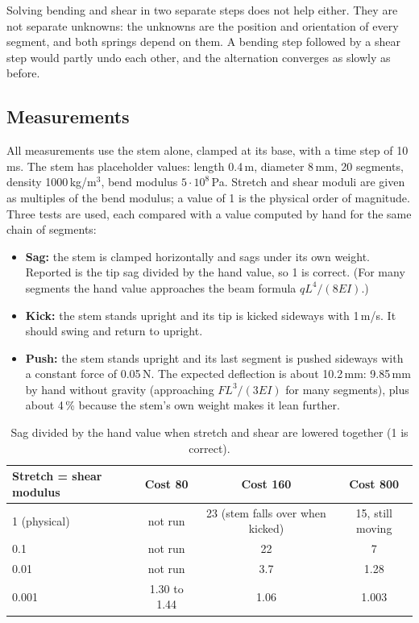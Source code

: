 \documentclass[11pt,a4paper]{article}
\begin{document}
Solving bending and shear in two separate steps does not help either. They are not separate unknowns: the
unknowns are the position and orientation of every segment, and both springs depend on them. A bending
step followed by a shear step would partly undo each other, and the alternation converges as slowly as
before.

\subsection{Measurements}

All measurements use the stem alone, clamped at its base, with a time step of 10\,ms. The stem has
placeholder values: length 0.4\,m, diameter 8\,mm, 20 segments, density 1000\,kg/m$^3$, bend modulus
$5\cdot10^{8}$\,Pa. Stretch and shear moduli are given as multiples of the bend modulus; a value of 1 is
the physical order of magnitude. Three tests are used, each compared with a value computed by hand for the
same chain of segments:
\begin{itemize}
  \item \textbf{Sag:} the stem is clamped horizontally and sags under its own weight. Reported is the tip
        sag divided by the hand value, so 1 is correct. (For many segments the hand value approaches the
        beam formula $qL^{4}/(8EI)$.)
  \item \textbf{Kick:} the stem stands upright and its tip is kicked sideways with 1\,m/s. It should swing
        and return to upright.
  \item \textbf{Push:} the stem stands upright and its last segment is pushed sideways with a constant
        force of 0.05\,N. The expected deflection is about 10.2\,mm: 9.85\,mm by hand without gravity
        (approaching $FL^{3}/(3EI)$ for many segments), plus about 4\,\% because the stem's own weight
        makes it lean further.
\end{itemize}

\begin{table}[h]
  \centering
  \caption{Sag divided by the hand value when stretch and shear are lowered together (1 is correct).}
  \label{tab:stem-together}
  \begin{tabular}{lccc}
    \toprule
    Stretch = shear modulus & Cost 80 & Cost 160 & Cost 800 \\
    \midrule
    1 (physical)  & not run      & 23 (stem falls over when kicked) & 15, still moving \\
    0.1           & not run      & 22   & 7     \\
    0.01          & not run      & 3.7  & 1.28  \\
    0.001         & 1.30 to 1.44 & 1.06 & 1.003 \\
    \bottomrule
  \end{tabular}
\end{table}
\end{document}
